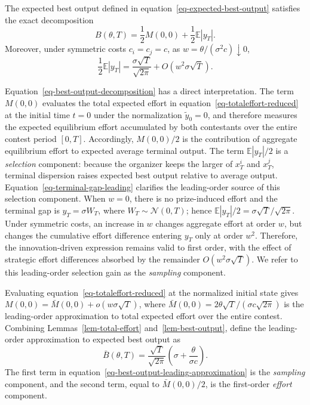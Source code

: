 \documentclass[mnsc]{informs3}
\begin{document}
\begin{lemma}\label{lem-best-output}
The expected best output defined in equation~\eqref{eq-expected-best-output} satisfies the exact decomposition
\begin{equation}\label{eq-best-output-decomposition}
B(\theta,T)
=\frac{1}{2}M(0,0)+\frac{1}{2}\mathbb E|y_T|.
\end{equation}
Moreover, under symmetric costs $c_i=c_j=c$, as $w=\theta/(\sigma^2c)\downarrow0$,
\begin{equation}\label{eq-terminal-gap-leading}
\frac12\mathbb E|y_T|
=\frac{\sigma\sqrt T}{\sqrt{2\pi}}
+O(w^2\sigma\sqrt T).
\end{equation}
\end{lemma}

Equation~\eqref{eq-best-output-decomposition} has a direct interpretation.
The term $M(0,0)$ evaluates the total expected effort in equation~\eqref{eq-totaleffort-reduced} at the initial time $t=0$ under the normalization $\tilde y_0=0$, and therefore measures the expected equilibrium effort accumulated by both contestants over the entire contest period $[0,T]$.
Accordingly, $M(0,0)/2$ is the contribution of aggregate equilibrium effort to expected average terminal output.
The term $\mathbb E|y_T|/2$ is a \textit{selection} component: because the organizer keeps the larger of $x_T^i$ and $x_T^j$, terminal dispersion raises expected best output relative to average output.
Equation~\eqref{eq-terminal-gap-leading} clarifies the leading-order source of this selection component.
When $w=0$, there is no prize-induced effort and the terminal gap is $y_T=\sigma W_T$, where $W_T\sim\mathcal N(0,T)$; hence $\mathbb E|y_T|/2=\sigma\sqrt T/\sqrt{2\pi}$.
Under symmetric costs, an increase in $w$ changes aggregate effort at order $w$, but changes the cumulative effort difference entering $y_T$ only at order $w^2$.
Therefore, the innovation-driven expression remains valid to first order, with the effect of strategic effort differences absorbed by the remainder $O(w^2\sigma\sqrt T)$.
We refer to this leading-order selection gain as the \textit{sampling} component.

Evaluating equation~\eqref{eq-totaleffort-reduced} at the normalized initial state gives $M(0,0)=\bar M(0,0)+o(w\sigma\sqrt T)$, where $\bar M(0,0)=2\theta\sqrt T/(\sigma c\sqrt{2\pi})$ is the leading-order approximation to total expected effort over the entire contest.
Combining Lemmas~\ref{lem-total-effort} and~\ref{lem-best-output}, define the leading-order approximation to expected best output as
\begin{equation}\label{eq-best-output-leading-approximation}
\bar B(\theta,T)
=\frac{\sqrt T}{\sqrt{2\pi}}
\left(\sigma+\frac{\theta}{\sigma c}\right).
\end{equation}
The first term in equation~\eqref{eq-best-output-leading-approximation} is the \textit{sampling} component, and the second term, equal to $\bar M(0,0)/2$, is the first-order \textit{effort} component.
\end{document}
